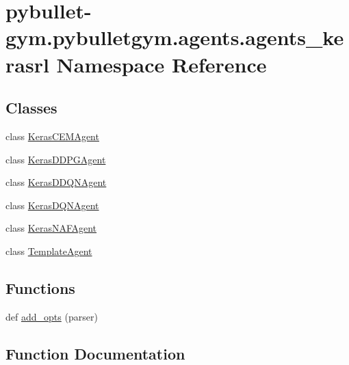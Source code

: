 \hypertarget{namespacepybullet-gym_1_1pybulletgym_1_1agents_1_1agents__kerasrl}{}\section{pybullet-\/gym.pybulletgym.\+agents.\+agents\+\_\+kerasrl Namespace Reference}
\label{namespacepybullet-gym_1_1pybulletgym_1_1agents_1_1agents__kerasrl}
\subsection*{Classes}
\begin{DoxyCompactItemize}
\item 
class \hyperlink{classpybullet-gym_1_1pybulletgym_1_1agents_1_1agents__kerasrl_1_1_keras_c_e_m_agent}{Keras\+C\+E\+M\+Agent}
\item 
class \hyperlink{classpybullet-gym_1_1pybulletgym_1_1agents_1_1agents__kerasrl_1_1_keras_d_d_p_g_agent}{Keras\+D\+D\+P\+G\+Agent}
\item 
class \hyperlink{classpybullet-gym_1_1pybulletgym_1_1agents_1_1agents__kerasrl_1_1_keras_d_d_q_n_agent}{Keras\+D\+D\+Q\+N\+Agent}
\item 
class \hyperlink{classpybullet-gym_1_1pybulletgym_1_1agents_1_1agents__kerasrl_1_1_keras_d_q_n_agent}{Keras\+D\+Q\+N\+Agent}
\item 
class \hyperlink{classpybullet-gym_1_1pybulletgym_1_1agents_1_1agents__kerasrl_1_1_keras_n_a_f_agent}{Keras\+N\+A\+F\+Agent}
\item 
class \hyperlink{classpybullet-gym_1_1pybulletgym_1_1agents_1_1agents__kerasrl_1_1_template_agent}{Template\+Agent}
\end{DoxyCompactItemize}
\subsection*{Functions}
\begin{DoxyCompactItemize}
\item 
def \hyperlink{namespacepybullet-gym_1_1pybulletgym_1_1agents_1_1agents__kerasrl_aa3350027187669a5a40c884b228ec7f0}{add\+\_\+opts} (parser)
\end{DoxyCompactItemize}


\subsection{Function Documentation}

